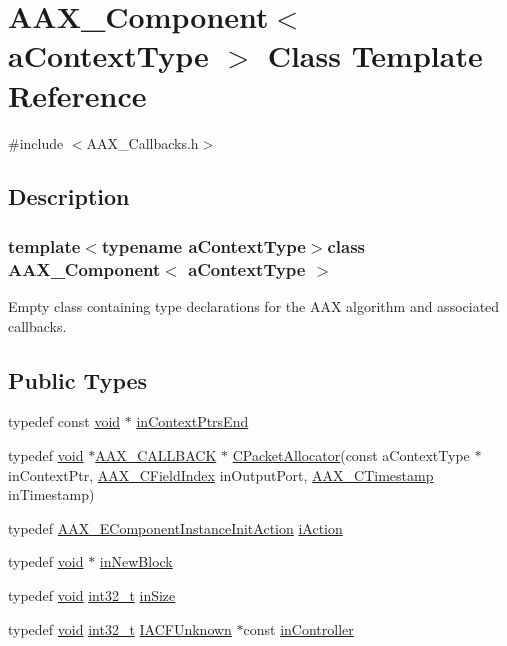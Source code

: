 \hypertarget{a00029}{}\section{A\+A\+X\+\_\+\+Component$<$ a\+Context\+Type $>$ Class Template Reference}
\label{a00029}


{\ttfamily \#include $<$A\+A\+X\+\_\+\+Callbacks.\+h$>$}



\subsection{Description}
\subsubsection*{template$<$typename a\+Context\+Type$>$class A\+A\+X\+\_\+\+Component$<$ a\+Context\+Type $>$}

Empty class containing type declarations for the A\+A\+X algorithm and associated callbacks. \subsection*{Public Types}
\begin{DoxyCompactItemize}
\item 
typedef const \hyperlink{a00029_a152cdf3bab64bdd62f9113c55d54e51f}{void} $\ast$ \hyperlink{a00029_ab8ecfd951dc7597c9021e7e335e8838b}{in\+Context\+Ptrs\+End}
\item 
typedef \hyperlink{a00029_a152cdf3bab64bdd62f9113c55d54e51f}{void} $\ast$\hyperlink{a00149_aaa22112139aa627574b1ef562f579d43}{A\+A\+X\+\_\+\+C\+A\+L\+L\+B\+A\+C\+K} $\ast$ \hyperlink{a00029_abdfa84e561bac489ea7e24bd6bd4eeb1}{C\+Packet\+Allocator}(const a\+Context\+Type $\ast$in\+Context\+Ptr, \hyperlink{a00149_ae807f8986143820cfb5d6da32165c9c7}{A\+A\+X\+\_\+\+C\+Field\+Index} in\+Output\+Port, \hyperlink{a00149_aae7325dbfa53a983f208a68cb563fba5}{A\+A\+X\+\_\+\+C\+Timestamp} in\+Timestamp)
\item 
typedef \hyperlink{a00206_aff5646376a3c93f032cf2400e0885023}{A\+A\+X\+\_\+\+E\+Component\+Instance\+Init\+Action} \hyperlink{a00029_a12812608d78f94dfc2f6679224481c85}{i\+Action}
\item 
typedef \hyperlink{a00029_a152cdf3bab64bdd62f9113c55d54e51f}{void} $\ast$ \hyperlink{a00029_a6111e5eb030776fe458760ec971243b1}{in\+New\+Block}
\item 
typedef \hyperlink{a00029_a152cdf3bab64bdd62f9113c55d54e51f}{void} \hyperlink{a00029_adfde6fdf25777c51a03f10818fcca471}{int32\+\_\+t} \hyperlink{a00029_a2fe0266dfbbf88bb690d8137e3c2f050}{in\+Size}
\item 
typedef \hyperlink{a00029_a152cdf3bab64bdd62f9113c55d54e51f}{void} \hyperlink{a00029_adfde6fdf25777c51a03f10818fcca471}{int32\+\_\+t} \hyperlink{a00146}{I\+A\+C\+F\+Unknown} $\ast$const \hyperlink{a00029_a0a1040cbf35839573f9c3e477abd6195}{in\+Controller}
\end{DoxyCompactItemize}
